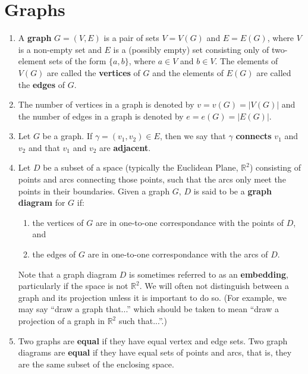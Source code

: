 \section{Graphs}\label{sec:graphs}

\begin{definition}\leavevmode
\begin{enumerate}
    \item \label{def:graph} A \textbf{graph} $G=(V, E)$ is a pair of sets $V=V(G)$ and $E=E(G)$, where $V$ is a non-empty set and $E$ is a (possibly empty) set consisting only of two-element sets of the form $\{a, b\}$, where $a \in V$ and $b \in V$.  The elements of $V(G)$ are called the \textbf{vertices} of $G$ and the elements of $E(G)$ are called the \textbf{edges} of $G$.
    \item The number of vertices in a graph is denoted by $v=v(G)=|V(G)|$ and the number of edges in a graph is denoted by $e=e(G)=|E(G)|$.
    \item Let $G$ be a graph.  If $\gamma=(v_1, v_2)\in E$, then we say that $\gamma$ \textbf{connects} $v_1$ and $v_2$ and that $v_1$ and $v_2$ are \textbf{adjacent}.
    \item \label{def:graph_diagram} Let $D$ be a subset of a space (typically the Euclidean Plane, $\mathbb{R}^2$) consisting of points and arcs connecting those points, such that the arcs only meet the points in their boundaries.  Given a graph $G$, $D$ is said to be a \textbf{graph diagram} for $G$ if:
    \begin{enumerate}
        \item the vertices of $G$ are in one-to-one correspondance with the points of $D$, and
        \item the edges of $G$ are in one-to-one correspondance with the arcs of $D$.
    \end{enumerate}
    Note that a graph diagram $D$ is sometimes referred to as an \textbf{embedding}, particularly if the space is not $\mathbb{R}^2$.  We will often not distinguish between a graph and its projection unless it is important to do so. (For example, we may say ``draw a graph that...'' which should be taken to mean ``draw a projection of a graph in $\mathbb{R}^2$ such that...''.)

    \item Two graphs are \textbf{equal} if they have equal vertex and edge sets.  Two graph diagrams are \textbf{equal} if they have equal sets of points and arcs, that is, they are the same subset of the enclosing space.
\end{enumerate}
\end{definition}

